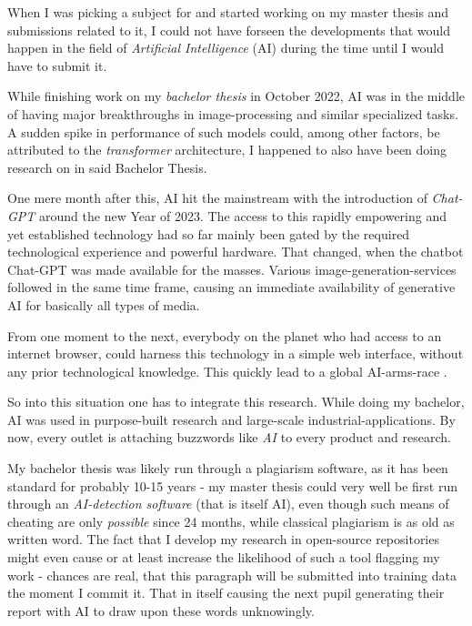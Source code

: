 When I was picking a subject for and started working on my master thesis and submissions related to it, I could not have forseen the developments that would happen in the field of \emph{Artificial Intelligence} (AI) during the time until I would have to submit it.

While finishing work on my \emph{bachelor thesis} \cite{selfBachelorThesis} in October 2022, AI was in the middle of having major breakthroughs in image-processing and similar specialized tasks. 
A sudden spike in performance of such models could, among other factors, be attributed to the \emph{transformer} architecture, I happened to also have been doing research on in said Bachelor Thesis.

One mere month after this, AI hit the mainstream with the introduction of \emph{Chat-GPT} \cite{chatGPT} around the new Year of 2023.
The access to this rapidly empowering and yet established technology had so far mainly been gated by the required technological experience and powerful hardware. 
That changed, when the chatbot Chat-GPT was made available for the masses. 
Various image-generation-services followed in the same time frame, causing an immediate availability of generative AI for basically all types of media.

From one moment to the next, everybody on the planet who had access to an internet browser, could harness this technology in a simple web interface, without any prior technological knowledge. 
This quickly lead to a global AI-arms-race \cite{aiBoom}.


So into this situation one has to integrate this research. 
While doing my bachelor, AI was used in purpose-built research and large-scale industrial-applications.
By now, every outlet is attaching buzzwords like \emph{AI} to every product and research.

My bachelor thesis was likely run through a plagiarism software, as it has been standard for probably 10-15 years - my master thesis could very well be first run through an \emph{AI-detection software} (that is itself \glqq AI\grqq), even though such means of cheating are only \emph{possible} since 24 months, while classical plagiarism is as old as written word.
The fact that I develop my research in open-source repositories might even cause or at least increase the likelihood of such a tool flagging my work - chances are real, that this paragraph will be submitted into training data the moment I commit it.
That in itself causing the next pupil generating their report with AI to draw upon these words unknowingly.\\

